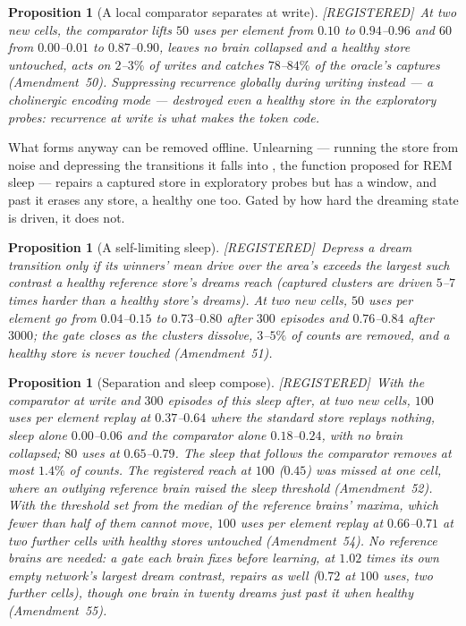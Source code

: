 \documentclass[11pt]{article}
\theoremstyle{definition}
\theoremstyle{plain}
\newtheorem{proposition}[lemma]{Proposition}
\newcommand{\REG}{\textnormal{\footnotesize\textsf{[REGISTERED]}}}
\begin{document}
\begin{proposition}[A local comparator separates at write]\label{prop:comparator} \REG\
At two new cells, the comparator lifts $50$ uses per element from $0.10$ to
$0.94$--$0.96$ and $60$ from $0.00$--$0.01$ to $0.87$--$0.90$, leaves no brain
collapsed and a healthy store untouched, acts on $2$--$3\%$ of writes and
catches $78$--$84\%$ of the oracle's captures (Amendment~50). Suppressing
recurrence globally during writing instead --- a cholinergic encoding mode
\citep{hasselmo2006role} --- destroyed even a healthy store in the
exploratory probes: recurrence at write is what makes the token code.
\end{proposition}

What forms anyway can be removed offline. Unlearning --- running the store
from noise and depressing the transitions it falls into
\citep{hopfield1983unlearning}, the function proposed for REM sleep
\citep{crick1983function} --- repairs a captured store in exploratory probes but
has a window, and past it erases any store, a healthy one too. Gated by how
hard the dreaming state is driven, it does not.

\begin{proposition}[A self-limiting sleep]\label{prop:sleep} \REG\
Depress a dream transition only if its winners' mean drive over the area's
exceeds the largest such contrast a healthy reference store's dreams reach
(captured clusters are driven $5$--$7$ times harder than a healthy store's
dreams). At two new cells, $50$ uses per element go from $0.04$--$0.15$ to
$0.73$--$0.80$ after $300$ episodes and $0.76$--$0.84$ after $3000$; the gate
closes as the clusters dissolve, $3$--$5\%$ of counts are removed, and a
healthy store is never touched (Amendment~51).
\end{proposition}

\begin{proposition}[Separation and sleep compose]\label{prop:lifecycle} \REG\
With the comparator at write and $300$ episodes of this sleep after, at two new
cells, $100$ uses per element replay at $0.37$--$0.64$ where the standard store
replays nothing, sleep alone $0.00$--$0.06$ and the comparator alone
$0.18$--$0.24$, with no brain collapsed; $80$ uses at $0.65$--$0.79$. The sleep that
follows the comparator removes at most $1.4\%$ of counts. The registered reach
at $100$ ($0.45$) was missed at one cell, where an outlying reference brain
raised the sleep threshold (Amendment~52). With the threshold set from the
median of the reference brains' maxima, which fewer than half of them cannot
move, $100$ uses per element replay at $0.66$--$0.71$ at two further cells with
healthy stores untouched (Amendment~54). No reference brains are needed: a gate
each brain fixes before learning, at $1.02$ times its own empty network's largest
dream contrast, repairs as well ($0.72$ at $100$ uses, two further cells), though
one brain in twenty dreams just past it when healthy (Amendment~55).
\end{proposition}
\end{document}
